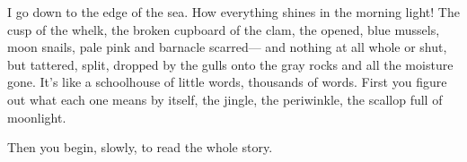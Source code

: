 
\begin{poem}
\begin{stanza}
\textsc{I} go down to the edge of the sea.\verseline
How everything shines in the morning light!\verseline
The cusp of the whelk,\verseline
the broken cupboard of the clam,\verseline
the opened, blue mussels,\verseline
moon snails, pale pink and barnacle scarred—\verseline
and nothing at all whole or shut, but tattered, split,\verseline
dropped by the gulls onto the gray rocks and all the moisture gone.\verseline
It's like a schoolhouse\verseline
of little words,\verseline
thousands of words.\verseline
First you figure out what each one means by itself,\verseline
the jingle, the periwinkle, the scallop full of moonlight.
\end{stanza}

\begin{stanza}
Then you begin, slowly, to read the whole story.
\end{stanza}
\end{poem}